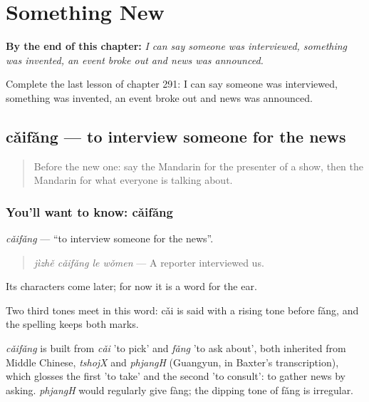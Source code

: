 
\chapter{Something New}
\label{ch:zh-something-new}

\begin{chapteropening}
\textbf{By the end of this chapter:} \emph{I can say someone was interviewed, something was invented, an event broke out and news was announced.}

Complete the last lesson of chapter 291: I can say someone was interviewed, something was invented, an event broke out and news was announced.
\end{chapteropening}

\section[cǎifǎng]{cǎifǎng — to interview someone for the news}

\label{lesson:ZH-C291-caifang}



\begin{quote}
Before the new one: say the Mandarin for the presenter of a show, then the Mandarin for what everyone is talking about.
\end{quote}

\subsection*{You'll want to know: cǎifǎng}
\emph{cǎifǎng} — \textquotedblleft{}to interview someone for the news\textquotedblright{}.

\begin{quote}
\emph{jìzhě cǎifǎng le wǒmen} — A reporter interviewed us.
\end{quote}

Its characters come later; for now it is a word for the ear.

Two third tones meet in this word: cǎi is said with a rising tone before fǎng, and the spelling keeps both marks.

\begin{cousinweb}
\emph{cǎifǎng} is built from \emph{cǎi} 'to pick' and \emph{fǎng} 'to ask about', both inherited from Middle Chinese, \emph{tshojX} and \emph{phjangH} (Guangyun, in Baxter's transcription), which glosses the first 'to take' and the second 'to consult': to gather news by asking. \emph{phjangH} would regularly give fàng; the dipping tone of fǎng is irregular.
\end{cousinweb}

